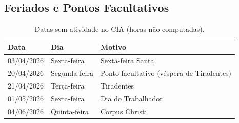 \subsection{Feriados e Pontos Facultativos}

\begin{table}[H]
\centering
\caption{Datas sem atividade no CIA (horas não computadas).}
\begin{tabular}{lll}
\toprule
\textbf{Data} & \textbf{Dia} & \textbf{Motivo} \\
\midrule
03/04/2026 & Sexta-feira & Sexta-feira Santa \\
20/04/2026 & Segunda-feira & Ponto facultativo (véspera de Tiradentes) \\
21/04/2026 & Terça-feira  & Tiradentes \\
01/05/2026 & Sexta-feira  & Dia do Trabalhador \\
04/06/2026 & Quinta-feira & Corpus Christi \\
\bottomrule
\end{tabular}
\end{table}
